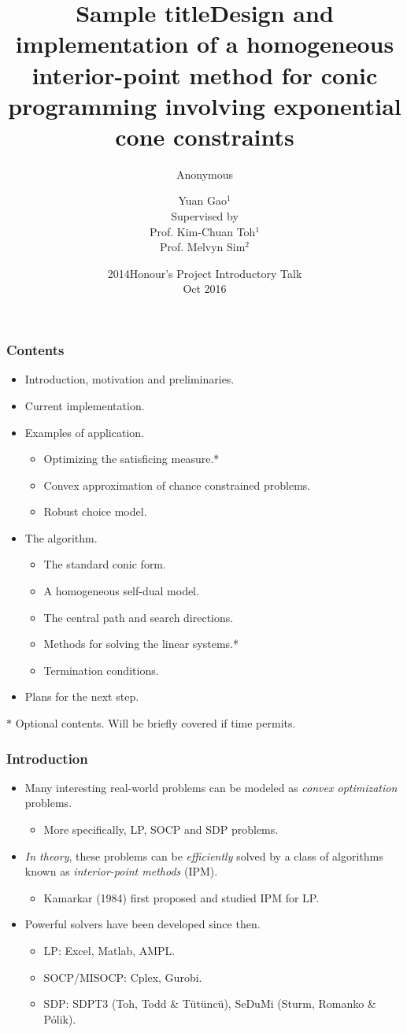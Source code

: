 \documentclass{beamer}
\title{Sample title}
\author{Anonymous}
\institute{ShareLaTeX}
\date{2014}
\title[About Beamer] %
 {Design and implementation of a homogeneous interior-point method for conic programming involving exponential cone constraints}
\author[gaoyuan] %
 {Yuan Gao$^1$ \\[1ex] Supervised by \\[0.5ex] Prof. Kim-Chuan Toh$^1$\\Prof. Melvyn Sim$^2$}
\institute[VFU] %
 {
 	$1$ Department of Mathematics, National University of Singapore\\
 	$2$ Department of Decision Sciences, National University of Singappore
 }
\date %
{Honour's Project Introductory Talk\\ Oct 2016}
\begin{document}
 
\frame{\titlepage}
 
\begin{frame}
\frametitle{Contents}
\begin{itemize}
	\item Introduction, motivation and preliminaries.
	\item Current implementation.
	\item Examples of application.
	\begin{itemize}
		\item Optimizing the satisficing measure.*
		\item Convex approximation of chance constrained problems.
		\item Robust choice model.
	\end{itemize}
		\item The algorithm.
	\begin{itemize}
		\item The standard conic form.
		\item A homogeneous self-dual model.
		\item The central path and search directions.
		\item Methods for solving the linear systems.*
		\item Termination conditions.
	\end{itemize}
	\item Plans for the next step.
\end{itemize}
\small{$*$ Optional contents. Will be briefly covered if time permits.}
\end{frame}

\begin{frame}
\frametitle{Introduction}
\begin{itemize}
\item Many interesting real-world problems can be modeled as \textit{convex optimization} problems.
	\begin{itemize}
		\item More specifically, LP, SOCP and SDP problems.
	\end{itemize}
\item \textit{In theory}, these problems can be \textit{efficiently} solved by a class of algorithms known as \textit{interior-point methods} (IPM).
	\begin{itemize}
		\item Kamarkar (1984) first proposed and studied IPM for LP.
	\end{itemize}
\item Powerful solvers have been developed since then.
	\begin{itemize}
		\item LP: Excel, Matlab, AMPL.
		\item SOCP/MISOCP: Cplex, Gurobi.
		\item SDP: SDPT3 (Toh, Todd \& T\"ut\"unc\"u), SeDuMi (Sturm, Romanko \& Pólik).
	\end{itemize}
\end{itemize}
\end{frame}
\end{document}
